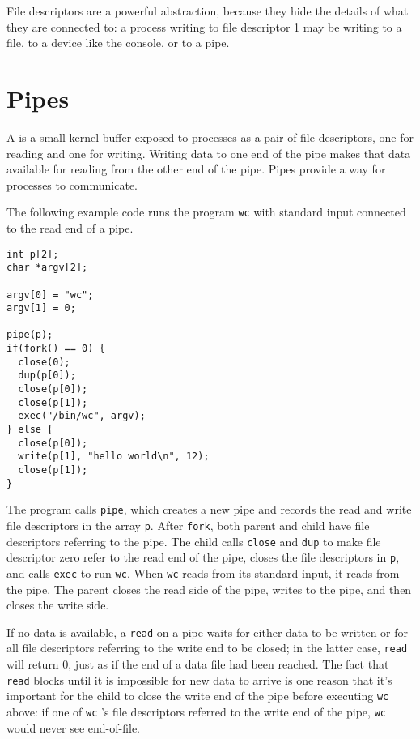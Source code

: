 File descriptors are a powerful abstraction,
because they hide the details of what they are connected to:
a process writing to file descriptor 1 may be writing to a
file, to a device like the console, or to a pipe.
\section{Pipes}

A 
is a small kernel buffer exposed to processes as a pair of
file descriptors, one for reading and one for writing.
Writing data to one end of the pipe
makes that data available for reading from the other end of the pipe.
Pipes provide a way for processes to communicate.

The following example code runs the program
\lstinline{wc}
with standard input connected to
the read end of a pipe.
\begin{lstlisting}[]
int p[2];
char *argv[2];

argv[0] = "wc";
argv[1] = 0;

pipe(p);
if(fork() == 0) {
  close(0);
  dup(p[0]);
  close(p[0]);
  close(p[1]);
  exec("/bin/wc", argv);
} else {
  close(p[0]);
  write(p[1], "hello world\n", 12);
  close(p[1]);
}
\end{lstlisting}
The program calls
\lstinline{pipe},
which creates a new pipe and records the read and write
file descriptors in the array
\lstinline{p}.
After
\lstinline{fork},
both parent and child have file descriptors referring to the pipe.
The child calls \lstinline{close} and \lstinline{dup} to make file descriptor
zero refer to the read end of the pipe,
closes the file descriptors in
\lstinline{p},
and calls \lstinline{exec} to run
\lstinline{wc}.
When 
\lstinline{wc}
reads from its standard input, it reads from the pipe.
The parent closes the read side of the pipe,
writes to the pipe,
and then closes the write side.

If no data is available, a
\lstinline{read}
on a pipe waits for either data to be written or for all
file descriptors referring to the write end to be closed;
in the latter case,
\lstinline{read}
will return 0, just as if the end of a data file had been reached.
The fact that
\lstinline{read}
blocks until it is impossible for new data to arrive
is one reason that it's important for the child to
close the write end of the pipe
before executing
\lstinline{wc}
above: if one of
\lstinline{wc} 's
file descriptors referred to the write end of the pipe,
\lstinline{wc}
would never see end-of-file.

